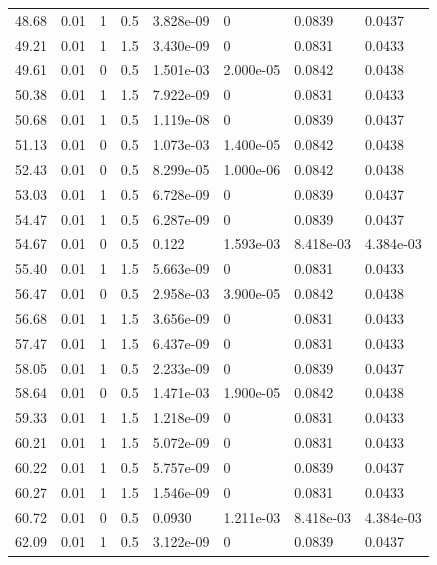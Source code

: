 \documentclass[preview]{standalone}
\begin{document}
{{{\begin{tabular}{L{1.2cm}C{1.2cm} C{0.3cm}C{0.5cm} C{1.4cm}C{1.4cm} C{1.4cm}C{1.4cm}}
  48.68  &  0.01  & 1     & 0.5 &  3.828e-09  & 0  & 0.0839 &  0.0437   \\ 
  49.21  &  0.01  & 1     & 1.5 &  3.430e-09  & 0  & 0.0831 &  0.0433   \\ 
  49.61  &  0.01  & 0     & 0.5 &  1.501e-03  & 2.000e-05  & 0.0842 &  0.0438   \\ 
  50.38  &  0.01  & 1     & 1.5 &  7.922e-09  & 0  & 0.0831 &  0.0433   \\ 
  50.68  &  0.01  & 1     & 0.5 &  1.119e-08  & 0  & 0.0839 &  0.0437   \\ 
  51.13  &  0.01  & 0     & 0.5 &  1.073e-03  & 1.400e-05  & 0.0842 &  0.0438   \\ 
  52.43  &  0.01  & 0     & 0.5 &  8.299e-05  & 1.000e-06  & 0.0842 &  0.0438   \\ 
  53.03  &  0.01  & 1     & 0.5 &  6.728e-09  & 0  & 0.0839 &  0.0437   \\ 
  54.47  &  0.01  & 1     & 0.5 &  6.287e-09  & 0  & 0.0839 &  0.0437   \\ 
  54.67  &  0.01  & 0     & 0.5 &  0.122  & 1.593e-03  & 8.418e-03 &  4.384e-03   \\ 
  55.40  &  0.01  & 1     & 1.5 &  5.663e-09  & 0  & 0.0831 &  0.0433   \\ 
  56.47  &  0.01  & 0     & 0.5 &  2.958e-03  & 3.900e-05  & 0.0842 &  0.0438   \\ 
  56.68  &  0.01  & 1     & 1.5 &  3.656e-09  & 0  & 0.0831 &  0.0433   \\ 
  57.47  &  0.01  & 1     & 1.5 &  6.437e-09  & 0  & 0.0831 &  0.0433   \\ 
  58.05  &  0.01  & 1     & 0.5 &  2.233e-09  & 0  & 0.0839 &  0.0437   \\ 
  58.64  &  0.01  & 0     & 0.5 &  1.471e-03  & 1.900e-05  & 0.0842 &  0.0438   \\ 
  59.33  &  0.01  & 1     & 1.5 &  1.218e-09  & 0  & 0.0831 &  0.0433   \\ 
  60.21  &  0.01  & 1     & 1.5 &  5.072e-09  & 0  & 0.0831 &  0.0433   \\ 
  60.22  &  0.01  & 1     & 0.5 &  5.757e-09  & 0  & 0.0839 &  0.0437   \\ 
  60.27  &  0.01  & 1     & 1.5 &  1.546e-09  & 0  & 0.0831 &  0.0433   \\ 
  60.72  &  0.01  & 0     & 0.5 &  0.0930  & 1.211e-03  & 8.418e-03 &  4.384e-03   \\ 
  62.09  &  0.01  & 1     & 0.5 &  3.122e-09  & 0  & 0.0839 &  0.0437   \\ 

\end{tabular}}}}
\end{document}
